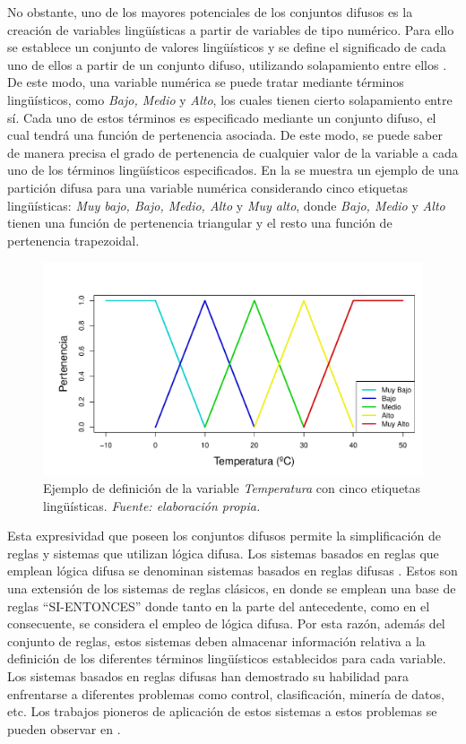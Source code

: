 \documentclass[c5paper,10pt,twoside]{book}	   	%
\begin{document}
No obstante, uno de los mayores potenciales de los conjuntos difusos es la creación de variables lingüísticas a partir de variables de tipo numérico. Para ello se establece un conjunto de valores lingüísticos y se define el significado de cada uno de ellos a partir de un conjunto difuso, utilizando solapamiento entre ellos \cite{Zad75}. De este modo, una variable numérica se puede tratar mediante términos lingüísticos, como \textit{Bajo, Medio} y \textit{Alto}, los cuales tienen cierto solapamiento entre sí. Cada uno de estos términos es especificado mediante un conjunto difuso, el cual tendrá una función de pertenencia asociada. De este modo, se puede saber de manera precisa el grado de pertenencia de cualquier valor de la variable a cada uno de los términos lingüísticos especificados. En la  se muestra un ejemplo de una partición difusa para una variable numérica considerando cinco etiquetas lingüísticas: \textit{Muy bajo, Bajo, Medio, Alto} y  \textit{Muy alto}, donde \textit{Bajo, Medio} y \textit{Alto} tienen una función de pertenencia triangular y el resto una función de pertenencia trapezoidal.


\begin{figure}[!hbtp]
	\centering
	\includegraphics[width=0.8\linewidth]{./Figures/fuzzy.pdf}
	\caption[Ejemplo de definición de la variable \textit{Temperatura} con cinco etiquetas lingüísticas.]{Ejemplo de definición de la variable \textit{Temperatura} con cinco etiquetas lingüísticas. \textit{Fuente: elaboración propia.}}
	\label{fig:conjuntoDifuso}
\end{figure}

Esta expresividad que poseen los conjuntos difusos permite la simplificación de reglas y sistemas que utilizan lógica difusa. Los sistemas basados en reglas que emplean lógica difusa se denominan sistemas basados en reglas difusas \cite{Hul05,Hul11}. Estos son una extensión de los sistemas de reglas clásicos, en donde se emplean una base de reglas ``SI-ENTONCES'' donde tanto en la parte del antecedente, como en el consecuente, se considera el empleo de lógica difusa. Por esta razón, además del conjunto de reglas, estos sistemas deben almacenar información relativa a la definición de los diferentes términos lingüísticos establecidos para cada variable. Los sistemas basados en reglas difusas han demostrado su habilidad para enfrentarse a diferentes problemas como control, clasificación, minería de datos, etc. Los trabajos pioneros de aplicación de estos sistemas a estos problemas se pueden observar en \cite{Wm92,Ped96,Palm97,Kun2000,Inn04}.
\end{document}
